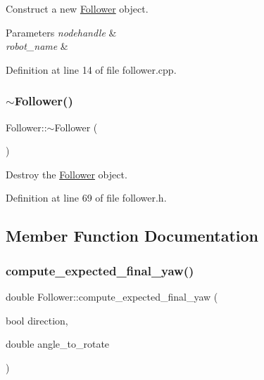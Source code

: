 Construct a new \hyperlink{class_follower}{Follower} object. 


\begin{DoxyParams}{Parameters}
{\em nodehandle} & \\
\hline
{\em robot\+\_\+name} & \\
\hline
\end{DoxyParams}


Definition at line 14 of file follower.\+cpp.

\mbox{\label{class_follower_a1dd55289af5ded7a57a2874c5477c33d}} 
\subsubsection{\texorpdfstring{$\sim$\+Follower()}{~Follower()}}
{\footnotesize\ttfamily Follower\+::$\sim$\+Follower (\begin{DoxyParamCaption}{ }\end{DoxyParamCaption})\hspace{0.3cm}{\ttfamily [inline]}}



Destroy the \hyperlink{class_follower}{Follower} object. 



Definition at line 69 of file follower.\+h.



\subsection{Member Function Documentation}
\mbox{\label{class_follower_a5573bec72ce4aed99706213154849b65}} 
\subsubsection{\texorpdfstring{compute\+\_\+expected\+\_\+final\+\_\+yaw()}{compute\_expected\_final\_yaw()}}
{\footnotesize\ttfamily double Follower\+::compute\+\_\+expected\+\_\+final\+\_\+yaw (\begin{DoxyParamCaption}\item[{bool}]{direction,  }\item[{double}]{angle\+\_\+to\+\_\+rotate }\end{DoxyParamCaption})}



